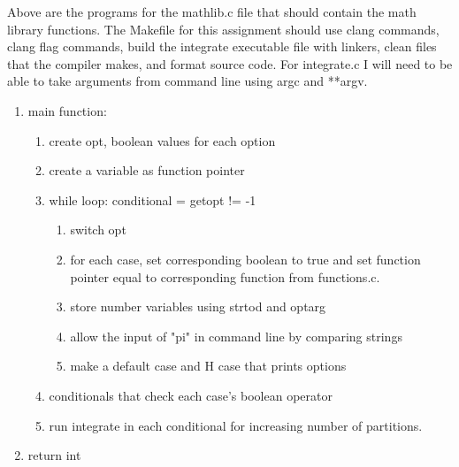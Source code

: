 \documentclass[11pt]{article}
\begin{document}
Above are the programs for the mathlib.c file that should contain the math library functions.
The Makefile for this assignment should use clang commands, clang flag commands, build the integrate executable file with linkers, clean files that the compiler makes, and format source code.
For integrate.c I will need to be able to take arguments from command line using argc and **argv.
\begin{enumerate}
	\item main function:
	\begin{enumerate}
		\item create opt, boolean values for each option
		\item create a variable as function pointer
		\item while loop: conditional = getopt != -1
		\begin{enumerate}
			\item switch opt
			\item for each case, set corresponding boolean to true and set function pointer equal to corresponding function from functions.c.
			\item store number variables using strtod and optarg
			\item allow the input of "pi" in command line by comparing strings
			\item make a default case and H case that prints options
		\end{enumerate}
		\item conditionals that check each case's boolean operator
		\item run integrate in each conditional for increasing number of partitions.
	\end{enumerate}
	\item return int
\end{enumerate}
\end{document}
